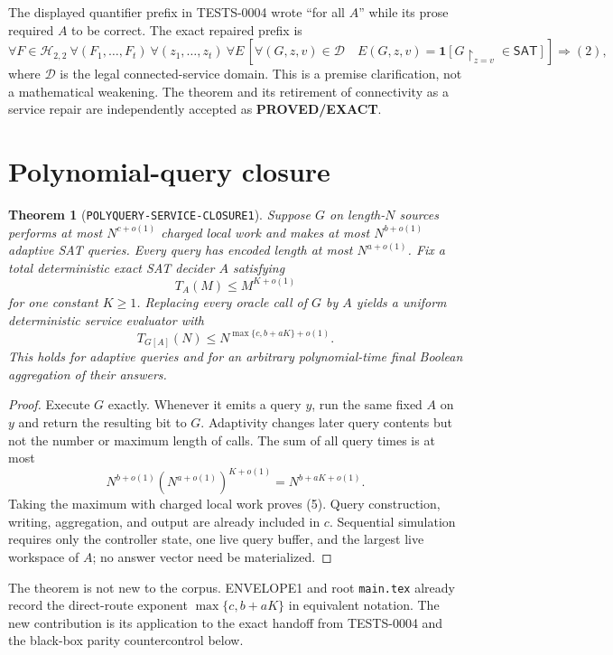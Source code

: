 \documentclass[11pt]{article}
\newtheorem{theorem}{Theorem}
\newcommand{\SAT}{\mathsf{SAT}}
\newcommand{\Htwo}{\mathcal H_{2,2}}
\newcommand{\EXACT}{\textbf{PROVED/EXACT}}
\begin{document}
The displayed quantifier prefix in TESTS-0004 wrote ``for all $A$'' while
its prose required $A$ to be correct.  The exact repaired prefix is
\[
 \forall F\in\Htwo\ \forall(F_1,\ldots,F_t)\ \forall(z_1,\ldots,z_t)\
 \forall E\,
 \left[
   \forall(G,z,v)\in\mathcal D\quad
   E(G,z,v)=\mathbf1[G\upharpoonright_{z=v}\in\SAT]
 \right]
 \Longrightarrow (2),                                    \tag{4}
\]
where $\mathcal D$ is the legal connected-service domain.  This is a premise
clarification, not a mathematical weakening.  The theorem and its retirement
of connectivity as a service repair are independently accepted as \EXACT.

\section{Polynomial-query closure}

\begin{theorem}[\texttt{POLYQUERY-SERVICE-CLOSURE1}]
Suppose $G$ on length-$N$ sources performs at most $N^{c+o(1)}$ charged local
work and makes at most $N^{b+o(1)}$ adaptive SAT queries.  Every query has
encoded length at most $N^{a+o(1)}$.  Fix a total deterministic exact SAT
decider $A$ satisfying
\[
 T_A(M)\le M^{K+o(1)}
\]
for one constant $K\ge1$.  Replacing every oracle call of $G$ by $A$ yields
a uniform deterministic service evaluator with
\[
 \boxed{T_{G[A]}(N)\le N^{\max\{c,b+aK\}+o(1)}}.           \tag{5}
\]
This holds for adaptive queries and for an arbitrary polynomial-time final
Boolean aggregation of their answers.
\end{theorem}

\begin{proof}
Execute $G$ exactly.  Whenever it emits a query $y$, run the same fixed $A$
on $y$ and return the resulting bit to $G$.  Adaptivity changes later query
contents but not the number or maximum length of calls.  The sum of all query
times is at most
\[
 N^{b+o(1)}\left(N^{a+o(1)}\right)^{K+o(1)}
 =N^{b+aK+o(1)}.
\]
Taking the maximum with charged local work proves (5).  Query construction,
writing, aggregation, and output are already included in $c$.  Sequential
simulation requires only the controller state, one live query buffer, and the
largest live workspace of $A$; no answer vector need be materialized.
\end{proof}

The theorem is not new to the corpus.  ENVELOPE1 and root \texttt{main.tex}
already record the direct-route exponent $\max\{c,b+aK\}$ in equivalent
notation.  The new contribution is its application to the exact handoff from
TESTS-0004 and the black-box parity countercontrol below.
\end{document}
